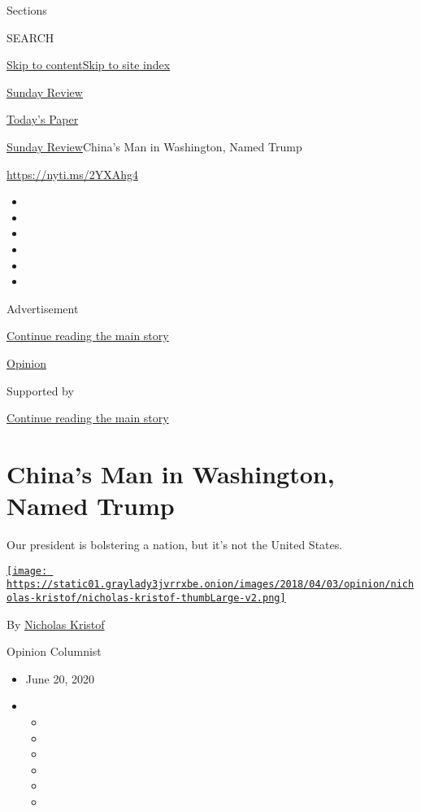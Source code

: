 Sections

SEARCH

\protect\hyperlink{site-content}{Skip to
content}\protect\hyperlink{site-index}{Skip to site index}

\href{https://www.nytimes3xbfgragh.onion/section/opinion/sunday}{Sunday
Review}

\href{https://myaccount.nytimes3xbfgragh.onion/auth/login?response_type=cookie\&client_id=vi}{}

\href{https://www.nytimes3xbfgragh.onion/section/todayspaper}{Today's
Paper}

\href{/section/opinion/sunday}{Sunday Review}\textbar{}China's Man in
Washington, Named Trump

\url{https://nyti.ms/2YXAhg4}

\begin{itemize}
\item
\item
\item
\item
\item
\item
\end{itemize}

Advertisement

\protect\hyperlink{after-top}{Continue reading the main story}

\href{/section/opinion}{Opinion}

Supported by

\protect\hyperlink{after-sponsor}{Continue reading the main story}

\hypertarget{chinas-man-in-washington-named-trump}{%
\section{China's Man in Washington, Named
Trump}\label{chinas-man-in-washington-named-trump}}

Our president is bolstering a nation, but it's not the United States.

\href{https://www.nytimes3xbfgragh.onion/column/nicholas-kristof}{\texttt{[image: https://static01.graylady3jvrrxbe.onion/images/2018/04/03/opinion/nicholas-kristof/nicholas-kristof-thumbLarge-v2.png]}}

By
\href{https://www.nytimes3xbfgragh.onion/column/nicholas-kristof}{Nicholas
Kristof}

Opinion Columnist

\begin{itemize}
\item
  June 20, 2020
\item
  \begin{itemize}
  \item
  \item
  \item
  \item
  \item
  \item
  \end{itemize}
\end{itemize}

